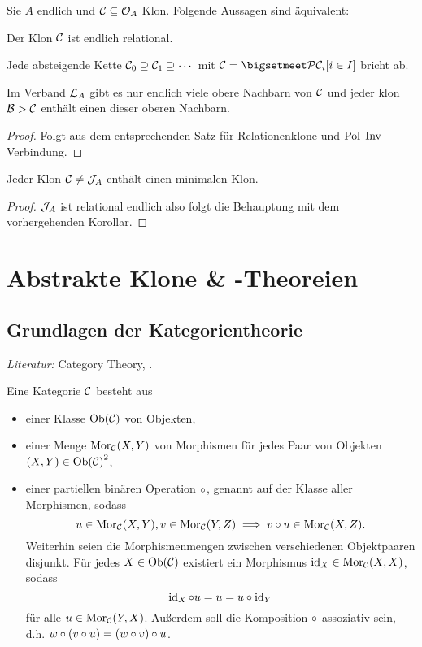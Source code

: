 \documentclass{book}
\begin{document}
\begin{corollary}
    Sie $A$ endlich und $\mathcal{C}\subseteq \mathcal{O}_A$ Klon. Folgende Aussagen sind äquivalent:
    \begin{statements}
            \item Der Klon $\mathcal{C}$ ist endlich relational.
            \item Jede absteigende Kette $\mathcal{C}_0\supseteq \mathcal{C}_1\supseteq \cdots$ mit $\cC=\bigsetmeet\set{\cC_i}[i\in I]$ bricht ab.
            \item Im Verband $\mathcal{L}_A$ gibt es nur endlich viele obere Nachbarn von $\mathcal{C}$ und jeder klon $\mathcal{B}>\mathcal{C}$ enthält einen dieser oberen Nachbarn.
    \end{statements}
\end{corollary}

\begin{proof}
    Folgt aus dem entsprechenden Satz für Relationenklone und $\mathop\mathrm{Pol}$-$\mathop\mathrm{Inv}$-Verbindung.
\end{proof}

\begin{corollary}
    Jeder Klon $\mathcal{C}\neq\mathcal{J}_A$ enthält einen minimalen Klon.
\end{corollary}

\begin{proof}
    $\mathcal{J}_A$ ist relational endlich also folgt die Behauptung mit dem vorhergehenden Korollar.
\end{proof}

\chapter{Abstrakte Klone \& -Theoreien}

\section{Grundlagen der Kategorientheorie}

\emph{Literatur:} Category Theory, .

\begin{definition}[Kategorie]
    Eine Kategorie $\mathcal{C}$ besteht aus
    \begin{itemize}
            \item einer Klasse $\mathop\mathrm{Ob}(\mathcal{C})$ von Objekten,
            \item einer Menge $\mathop\mathrm{Mor}\nolimits_{\mathcal{C}}(X,Y)$ von Morphismen für jedes Paar von Objekten $(X,Y)\in{\mathop\mathrm{Ob}(\mathcal{C})}^2$,
            \item einer partiellen binären Operation $\circ$, genannt  auf der Klasse aller Morphismen, sodass
        $$
        u\in\mathop\mathrm{Mor}\nolimits_{\mathcal{C}}(X,Y),v\in\mathop\mathrm{Mor}\nolimits_{\mathcal{C}}(Y,Z)\implies v\circ u\in\mathop\mathrm{Mor}\nolimits_{\mathcal{C}}(X,Z).
        $$
        Weiterhin seien die Morphismenmengen zwischen verschiedenen Objektpaaren disjunkt.
        Für jedes $X\in\mathop\mathrm{Ob}(\mathcal{C})$ existiert ein Morphismus $\mathop\mathrm{id}\nolimits_X\in\mathop\mathrm{Mor}\nolimits_{\mathcal{C}}(X,X)$, sodass
        $$
        \mathop\mathrm{id}\nolimits_X\circ u=u=u\circ \mathop\mathrm{id}\nolimits_Y
        $$
        für alle $u\in\mathop\mathrm{Mor}\nolimits_{\mathcal{C}}(Y,X)$.
        Außerdem soll die Komposition $\circ$ assoziativ sein, d.h. $w\circ(v\circ u)=(w\circ v)\circ u$.
    \end{itemize}
\end{definition}
\end{document}
